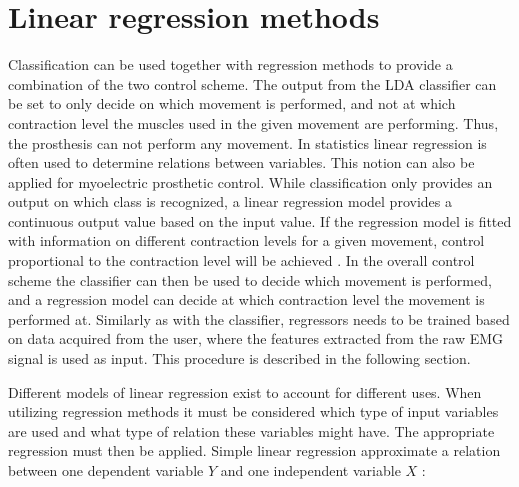 \section{Linear regression methods} \label{sec:BG:linearRegressionMethods}
Classification can be used together with regression methods to provide a combination of the two control scheme. The output from the LDA classifier can be set to only decide on which movement is performed, and not
at which contraction level the muscles used in the given movement are performing. Thus, the prosthesis can not perform any movement.  In statistics linear regression is often used to determine relations between variables. This notion can also be applied for myoelectric prosthetic control. While classification only provides an output on which class is recognized, a linear regression model provides a continuous output value based on the input value. If the regression model is fitted with information on different contraction levels for a given movement, control proportional to the contraction level will be achieved \cite{Hwang2017, Hahne2014, Bruun2017}. In the overall control scheme the classifier can then be used to decide which movement is performed, and a regression model can decide at which contraction level the movement is performed at. Similarly as with the classifier, regressors needs to be trained based on data acquired from the user, where the features extracted from the raw EMG signal is used as input. This procedure is described in the following section. 

Different models of linear regression exist to account for different uses. When utilizing regression methods it must be considered which type of input variables are used and what type of relation these variables might have. The appropriate regression must then be applied. Simple linear regression approximate a relation between one dependent variable $Y$ and one independent variable $X$ \cite{Zar2009}:

